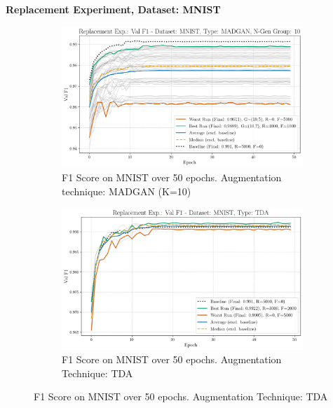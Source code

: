 
\newpage
 \noindent\textbf{Replacement Experiment, Dataset: MNIST}
\begin{figure}[H]
	\centering
	\begin{subfigure}{.85\textwidth}
		\includegraphics[width=\textwidth]{abb/strat_classifier_performance/MNIST_STRATIFIED_CLASSIFIERS_MADGAN_NEW/replacement_experiments/val_f1_score_MADGAN_MNIST_n_gen_10_all.png}
		\caption{F1 Score on MNIST over 50 epochs. Augmentation technique: MADGAN (K=10)}
        \label{fig:res_replacement_mnist_tda_vs_madgan__madgan}
	\end{subfigure}
	\begin{subfigure}{.85\textwidth}
		\includegraphics[width=\textwidth]{abb/strat_classifier_performance/tda_mnist/replacement_experiments/val_f1_score_tda_mnist_mnist_all.png}
		\caption{F1 Score on MNIST over 50 epochs. Augmentation Technique: TDA}
        \label{fig:res_replacement_mnist_tda_vs_madgan__tda}
	\end{subfigure}
\end{figure}

